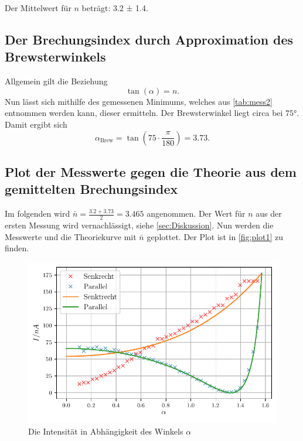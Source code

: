 Der Mittelwert für $n$ beträgt: 3.2 ± 1.4.


\subsection{Der Brechungsindex durch Approximation des Brewsterwinkels}

Allgemein gilt die Beziehung
\begin{equation*}
  \tan (\alpha) = n.
\end{equation*}
Nun lässt sich mithilfe des gemessenen Minimums, welches aus \autoref{tab:mess2} entnommen werden kann,
dieser ermitteln. Der Brewsterwinkel liegt circa bei $75 °$.
Damit ergibt sich
\begin{equation}
  \alpha_\text{Brew} = \tan \left( 75 \cdot \frac{\pi}{180} \right) = 3.73.
\end{equation}

\subsection{Plot der Messwerte gegen die Theorie aus dem gemittelten Brechungsindex}
Im folgenden wird $\bar{n} = \frac{3.2 + 3.73}{2} = 3.465$ angenommen.
Der Wert für $n$ aus der ersten Messung wird vernachlässigt, siehe \autoref{sec:Diskussion}.
Nun werden die Messwerte und die Theoriekurve mit $\bar{n}$ geplottet.
Der Plot ist in \autoref{fig:plot1} zu finden.

\begin{figure}
  \centering
  \caption{Die Intensität in Abhängigkeit des Winkels $\alpha$}
  \label{fig:plot1}
  \includegraphics[]{build/plot1.pdf}
\end{figure}